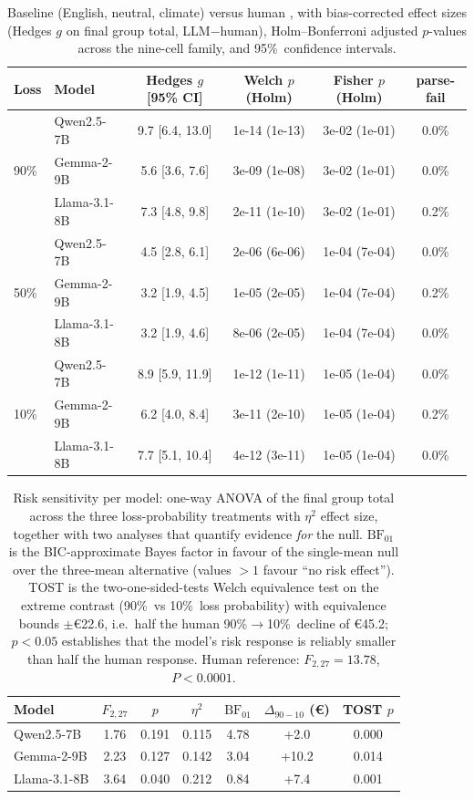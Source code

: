 \begin{table}[t]\centering
\caption{Baseline (English, neutral, climate) versus human \cite{milinski2008climate}, with bias-corrected effect sizes (Hedges $g$ on final group total, LLM$-$human), Holm--Bonferroni adjusted $p$-values across the nine-cell family, and 95\%\ confidence intervals.}
\label{tab:si_baseline}
\begin{tabular}{llcccc}
\toprule
Loss & Model & Hedges $g$ [95\% CI] & Welch $p$ (Holm) & Fisher $p$ (Holm) & parse-fail \\
\midrule
\multirow{3}{*}{90\%} & Qwen2.5-7B & 9.7 [6.4, 13.0] & 1e-14 (1e-13) & 3e-02 (1e-01) & 0.0\% \\
 & Gemma-2-9B & 5.6 [3.6, 7.6] & 3e-09 (1e-08) & 3e-02 (1e-01) & 0.0\% \\
 & Llama-3.1-8B & 7.3 [4.8, 9.8] & 2e-11 (1e-10) & 3e-02 (1e-01) & 0.2\% \\
\midrule
\multirow{3}{*}{50\%} & Qwen2.5-7B & 4.5 [2.8, 6.1] & 2e-06 (6e-06) & 1e-04 (7e-04) & 0.0\% \\
 & Gemma-2-9B & 3.2 [1.9, 4.5] & 1e-05 (2e-05) & 1e-04 (7e-04) & 0.2\% \\
 & Llama-3.1-8B & 3.2 [1.9, 4.6] & 8e-06 (2e-05) & 1e-04 (7e-04) & 0.0\% \\
\midrule
\multirow{3}{*}{10\%} & Qwen2.5-7B & 8.9 [5.9, 11.9] & 1e-12 (1e-11) & 1e-05 (1e-04) & 0.0\% \\
 & Gemma-2-9B & 6.2 [4.0, 8.4] & 3e-11 (2e-10) & 1e-05 (1e-04) & 0.2\% \\
 & Llama-3.1-8B & 7.7 [5.1, 10.4] & 4e-12 (3e-11) & 1e-05 (1e-04) & 0.0\% \\
\bottomrule\end{tabular}\end{table}

\begin{table}[t]\centering
\caption{Risk sensitivity per model: one-way ANOVA of the final group total across the three loss-probability treatments with $\eta^2$ effect size, together with two analyses that quantify evidence \emph{for} the null. $\mathrm{BF}_{01}$ is the BIC-approximate Bayes factor in favour of the single-mean null over the three-mean alternative (values $>1$ favour ``no risk effect''). TOST is the two-one-sided-tests Welch equivalence test on the extreme contrast (90\%\ vs 10\%\ loss probability) with equivalence bounds $\pm$\euro 22.6, i.e.\ half the human 90\%$\to$10\%\ decline of \euro 45.2; $p<0.05$ establishes that the model's risk response is reliably smaller than half the human response. Human reference: $F_{2,27}=13.78$, $P<0.0001$.}
\label{tab:si_anova}
\begin{tabular}{lcccccc}\toprule
Model & $F_{2,27}$ & $p$ & $\eta^2$ & $\mathrm{BF}_{01}$ & $\Delta_{90-10}$ (\euro) & TOST $p$ \\\midrule
Qwen2.5-7B & 1.76 & 0.191 & 0.115 & 4.78 & +2.0 & 0.000 \\
Gemma-2-9B & 2.23 & 0.127 & 0.142 & 3.04 & +10.2 & 0.014 \\
Llama-3.1-8B & 3.64 & 0.040 & 0.212 & 0.84 & +7.4 & 0.001 \\
\bottomrule\end{tabular}\end{table}

